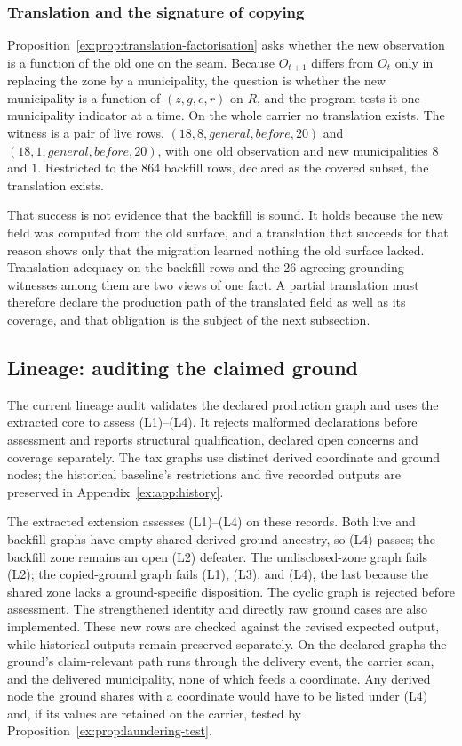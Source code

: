 \documentclass[11pt]{article}
\theoremstyle{definition}
\begin{document}
\subsubsection{Translation and the signature of copying}

Proposition~\ref{ex:prop:translation-factorisation} asks whether the new observation is a function of the old one on the seam. Because $O_{t+1}$ differs from $O_t$ only in replacing the zone by a municipality, the question is whether the new municipality is a function of $(z,g,e,r)$ on $R$, and the program tests it one municipality indicator at a time. On the whole carrier no translation exists. The witness is a pair of live rows, $(18,8,\mathit{general},\mathit{before},20)$ and $(18,1,\mathit{general},\mathit{before},20)$, with one old observation and new municipalities $8$ and $1$. Restricted to the 864 backfill rows, declared as the covered subset, the translation exists.

That success is not evidence that the backfill is sound. It holds because the new field was computed from the old surface, and a translation that succeeds for that reason shows only that the migration learned nothing the old surface lacked. Translation adequacy on the backfill rows and the 26 agreeing grounding witnesses among them are two views of one fact. A partial translation must therefore declare the production path of the translated field as well as its coverage, and that obligation is the subject of the next subsection.

\subsection{Lineage: auditing the claimed ground}\label{ex:sec:case-audit}

The current lineage audit validates the declared production graph and uses the extracted core to assess (L1)--(L4). It rejects malformed declarations before assessment and reports structural qualification, declared open concerns and coverage separately. The tax graphs use distinct derived coordinate and ground nodes; the historical baseline's restrictions and five recorded outputs are preserved in Appendix~\ref{ex:app:history}.

The extracted extension assesses (L1)--(L4) on these records. Both live and backfill graphs have empty shared derived ground ancestry, so (L4) passes; the backfill zone remains an open (L2) defeater. The undisclosed-zone graph fails (L2); the copied-ground graph fails (L1), (L3), and (L4), the last because the shared zone lacks a ground-specific disposition. The cyclic graph is rejected before assessment. The strengthened identity and directly raw ground cases are also implemented. These new rows are checked against the revised expected output, while historical outputs remain preserved separately. On the declared graphs the ground's claim-relevant path runs through the delivery event, the carrier scan, and the delivered municipality, none of which feeds a coordinate. Any derived node the ground shares with a coordinate would have to be listed under (L4) and, if its values are retained on the carrier, tested by Proposition~\ref{ex:prop:laundering-test}.
\end{document}
